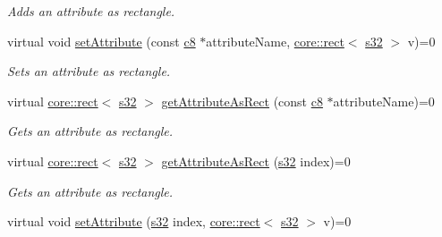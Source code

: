 \begin{DoxyCompactItemize}
\begin{DoxyCompactList}\small\item\em Adds an attribute as rectangle. \end{DoxyCompactList}\item 
\mbox{\label{classirr_1_1io_1_1IAttributes_aa564013b1dda96e618f949a8308af4b1}} 
virtual void \hyperlink{classirr_1_1io_1_1IAttributes_aa564013b1dda96e618f949a8308af4b1}{set\+Attribute} (const \hyperlink{namespaceirr_a9395eaea339bcb546b319e9c96bf7410}{c8} $\ast$attribute\+Name, \hyperlink{classirr_1_1core_1_1rect}{core\+::rect}$<$ \hyperlink{namespaceirr_ac66849b7a6ed16e30ebede579f9b47c6}{s32} $>$ v)=0
\begin{DoxyCompactList}\small\item\em Sets an attribute as rectangle. \end{DoxyCompactList}\item 
virtual \hyperlink{classirr_1_1core_1_1rect}{core\+::rect}$<$ \hyperlink{namespaceirr_ac66849b7a6ed16e30ebede579f9b47c6}{s32} $>$ \hyperlink{classirr_1_1io_1_1IAttributes_ac2d077105e2e7c263ea181f67a005cc2}{get\+Attribute\+As\+Rect} (const \hyperlink{namespaceirr_a9395eaea339bcb546b319e9c96bf7410}{c8} $\ast$attribute\+Name)=0
\begin{DoxyCompactList}\small\item\em Gets an attribute as rectangle. \end{DoxyCompactList}\item 
virtual \hyperlink{classirr_1_1core_1_1rect}{core\+::rect}$<$ \hyperlink{namespaceirr_ac66849b7a6ed16e30ebede579f9b47c6}{s32} $>$ \hyperlink{classirr_1_1io_1_1IAttributes_af8efe18246d51e968da7d6380515dcd1}{get\+Attribute\+As\+Rect} (\hyperlink{namespaceirr_ac66849b7a6ed16e30ebede579f9b47c6}{s32} index)=0
\begin{DoxyCompactList}\small\item\em Gets an attribute as rectangle. \end{DoxyCompactList}\item 
\mbox{\label{classirr_1_1io_1_1IAttributes_a30f5097b085ad4c60d118028ee9384ec}} 
virtual void \hyperlink{classirr_1_1io_1_1IAttributes_a30f5097b085ad4c60d118028ee9384ec}{set\+Attribute} (\hyperlink{namespaceirr_ac66849b7a6ed16e30ebede579f9b47c6}{s32} index, \hyperlink{classirr_1_1core_1_1rect}{core\+::rect}$<$ \hyperlink{namespaceirr_ac66849b7a6ed16e30ebede579f9b47c6}{s32} $>$ v)=0

\end{DoxyCompactItemize}
